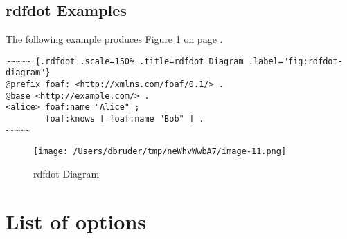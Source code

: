 \documentclass[]{article}
\begin{document}
\subsection{rdfdot Examples}\label{rdfdot-examples}

The following example produces Figure \ref{"fig:rdfdot-diagram"} on page
\pageref{"fig:rdfdot-diagram"}.

\scriptsize

\begin{verbatim}
~~~~~ {.rdfdot .scale=150% .title=rdfdot Diagram .label="fig:rdfdot-diagram"}
@prefix foaf: <http://xmlns.com/foaf/0.1/> .
@base <http://example.com/> .
<alice> foaf:name "Alice" ;
        foaf:knows [ foaf:name "Bob" ] .
~~~~~
\end{verbatim}

\normalsize

\begin{figure}[htbp]
\centering
\texttt{[image: /Users/dbruder/tmp/neWhvWwbA7/image-11.png]}
\caption{rdfdot Diagram\label{"fig:rdfdot-diagram"}}
\end{figure}

\newpage

\section{List of options}\label{list-of-options}
\end{document}
